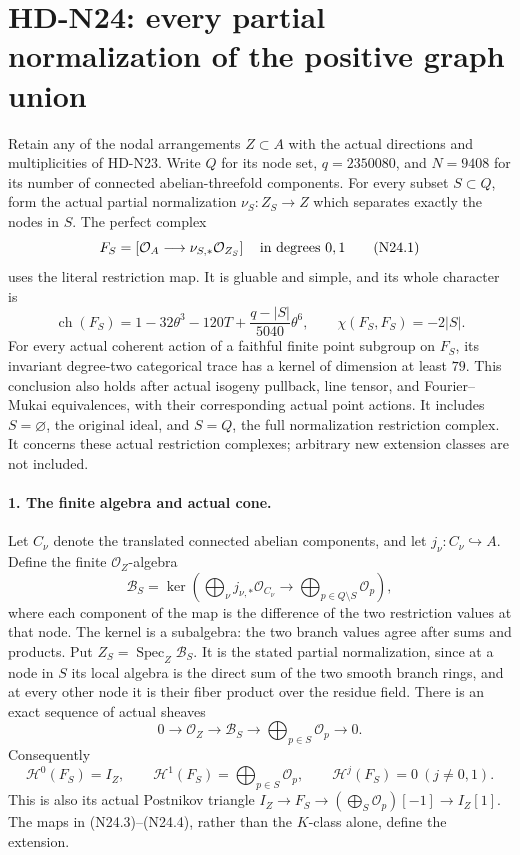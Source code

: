 \section{HD-N24: every partial normalization of the positive graph union}
\label{sec:partial-normalization-graph-union}

Retain any of the nodal arrangements $Z\subset A$ with the
actual directions and multiplicities of HD-N23. Write $Q$ for
its node set, $q=2350080$, and $N=9408$ for its number of
connected abelian-threefold components. For every subset
$S\subset Q$, form the actual partial normalization
$\nu_S:Z_S\to Z$ which separates exactly the nodes in $S$.
The perfect complex
\[
 F_S=\left[\mathcal O_A\longrightarrow
                    \nu_{S,*}\mathcal O_{Z_S}\right]
                  \quad\hbox{in degrees }0,1                \tag{N24.1}
\]
uses the literal restriction map. It is gluable and simple, and
its whole character is
\[
 \operatorname{ch}(F_S)
 =1-32\theta^3-120T+\frac{q-|S|}{5040}\theta^6,
 \qquad\chi(F_S,F_S)=-2|S|.                                \tag{N24.2}
\]
For every actual coherent action of a faithful finite point
subgroup on $F_S$, its invariant degree-two categorical trace
has a kernel of dimension at least $79$. This conclusion also
holds after actual isogeny pullback, line tensor, and
Fourier--Mukai equivalences, with their corresponding actual
point actions. It includes $S=\varnothing$, the original ideal,
and $S=Q$, the full normalization restriction complex. It
concerns these actual restriction complexes; arbitrary new
extension classes are not included.

\paragraph{1. The finite algebra and actual cone.}
Let $C_\nu$ denote the translated connected abelian components,
and let $j_\nu:C_\nu\hookrightarrow A$. Define the finite
$\mathcal O_Z$-algebra
\[
 \mathcal B_S=
 \ker\left(\bigoplus_\nu j_{\nu,*}\mathcal O_{C_\nu}
        \longrightarrow\bigoplus_{p\in Q\setminus S}\mathcal O_p
                                                \right),    \tag{N24.3}
\]
where each component of the map is the difference of the two
restriction values at that node. The kernel is a subalgebra:
the two branch values agree after sums and products. Put
$Z_S=\operatorname{Spec}_Z\mathcal B_S$. It is the stated
partial normalization, since at a node in $S$ its local algebra
is the direct sum of the two smooth branch rings, and at every
other node it is their fiber product over the residue field.
There is an exact sequence of actual sheaves
\[
 0\longrightarrow\mathcal O_Z\longrightarrow\mathcal B_S
             \longrightarrow\bigoplus_{p\in S}\mathcal O_p
                         \longrightarrow0.                 \tag{N24.4}
\]
Consequently
\[
 \mathcal H^0(F_S)=I_Z,\qquad
 \mathcal H^1(F_S)=\bigoplus_{p\in S}\mathcal O_p,\qquad
             \mathcal H^j(F_S)=0\ (j\ne0,1).               \tag{N24.5}
\]
This is also its actual Postnikov triangle
$I_Z\to F_S\to(\bigoplus_{S}\mathcal O_p)[-1]\to I_Z[1]$.
The maps in (N24.3)--(N24.4), rather than the $K$-class alone,
define the extension.

